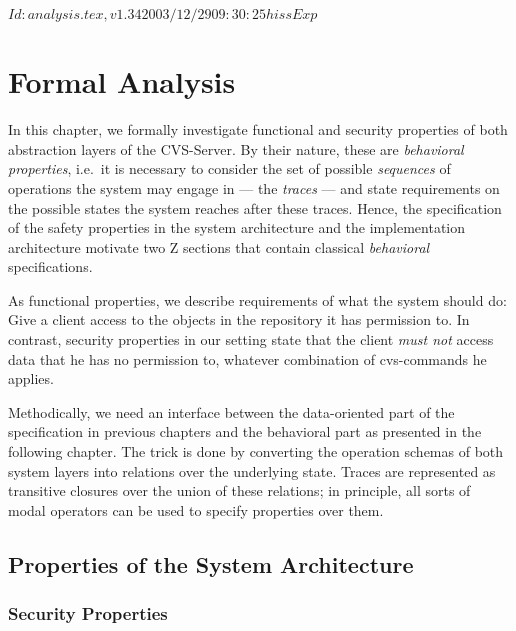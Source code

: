 \rcsInfo $Id: analysis.tex,v 1.34 2003/12/29 09:30:25 hiss Exp $

\chapter{Formal Analysis}

In this chapter, we formally investigate functional and security properties of
both abstraction layers of the CVS-Server. By their nature, these are
\emph{behavioral properties}, i.e.\ it is necessary to consider the set of possible
\emph{sequences} of operations the system may engage in --- the \emph{traces}
--- and state requirements on the possible states the system reaches after these
traces. Hence, the specification of the safety properties in the system
architecture and the implementation architecture motivate two Z sections that
contain classical \emph{behavioral} specifications.

As functional properties, we describe requirements of what the system should do:
Give a client access to the objects in the repository it has permission to. In
contrast, security properties in our setting state that the client \emph{must
  not} access data that he has no permission to, whatever combination of
cvs-commands he applies.

Methodically, we need an interface between the data-oriented part of the
specification in previous chapters and the behavioral part as presented in the
following chapter. The trick is done by converting the operation schemas of both
system layers into relations over the underlying state. Traces are represented
as transitive closures over the union of these relations; in principle, all
sorts of modal operators can be used to specify properties over them.


\section[System Architecture]{Properties of the System Architecture}

\subsection{Security Properties}\label{sec:secprop1}

\vspace{1ex}\noindent

